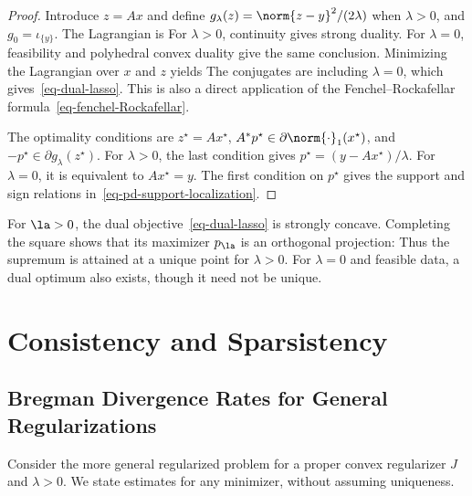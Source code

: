 \begin{proof}
Introduce $z=Ax$ and define $g_\lambda(z)=\norm{z-y}^2/(2\lambda)$ when $\lambda>0$, and $g_0=\iota_{\{y\}}$. The Lagrangian is
For $\lambda>0$, continuity gives strong duality. For $\lambda=0$, feasibility and polyhedral convex duality give the same conclusion. Minimizing the Lagrangian over $x$ and $z$ yields
The conjugates are
including $\lambda=0$, which gives~\eqref{eq-dual-lasso}. This is also a direct application of the Fenchel--Rockafellar formula~\eqref{eq-fenchel-Rockafellar}.

The optimality conditions are $z^\star=Ax^\star$, $A^*p^\star\in\partial\norm{\cdot}_1(x^\star)$, and $-p^\star\in\partial g_\lambda(z^\star)$. For $\lambda>0$, the last condition gives $p^\star=(y-Ax^\star)/\lambda$. For $\lambda=0$, it is equivalent to $Ax^\star=y$. The first condition on $p^\star$ gives the support and sign relations in~\eqref{eq-pd-support-localization}.
\end{proof}


For $\la>0$, the dual objective~\eqref{eq-dual-lasso} is strongly concave. Completing the square shows that its maximizer $p_\la$ is an orthogonal projection:
Thus the supremum is attained at a unique point for $\lambda>0$. For $\lambda=0$ and feasible data, a dual optimum also exists, though it need not be unique.


\section{Consistency and Sparsistency}

\subsection{Bregman Divergence Rates for General Regularizations}

Consider the more general regularized problem
for a proper convex regularizer $J$ and $\lambda>0$. We state estimates for any minimizer, without assuming uniqueness.

